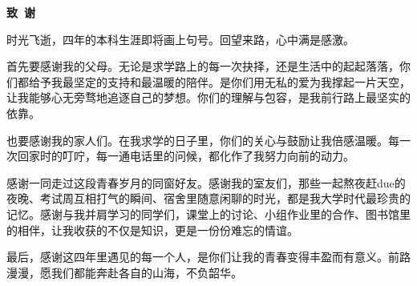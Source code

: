\cleardoublepage{}
\begin{center}
    \bfseries {} 致~谢
\end{center}

时光飞逝，四年的本科生涯即将画上句号。回望来路，心中满是感激。

首先要感谢我的父母。无论是求学路上的每一次抉择，还是生活中的起起落落，你们都给予我最坚定的支持和最温暖的陪伴。是你们用无私的爱为我撑起一片天空，让我能够心无旁骛地追逐自己的梦想。你们的理解与包容，是我前行路上最坚实的依靠。

也要感谢我的家人们。在我求学的日子里，你们的关心与鼓励让我倍感温暖。每一次回家时的叮咛，每一通电话里的问候，都化作了我努力向前的动力。

感谢一同走过这段青春岁月的同窗好友。感谢我的室友们，那些一起熬夜赶due的夜晚、考试周互相打气的瞬间、宿舍里随意闲聊的时光，都是我大学时代最珍贵的记忆。感谢与我并肩学习的同学们，课堂上的讨论、小组作业里的合作、图书馆里的相伴，让我收获的不仅是知识，更是一份份难忘的情谊。

最后，感谢这四年里遇见的每一个人，是你们让我的青春变得丰盈而有意义。前路漫漫，愿我们都能奔赴各自的山海，不负韶华。
